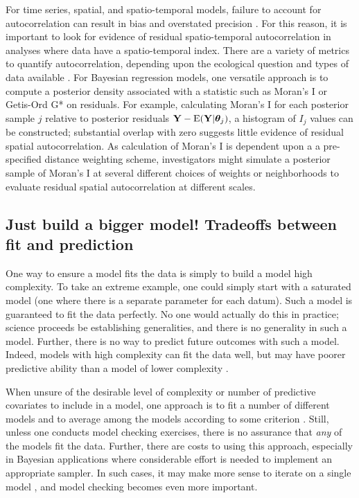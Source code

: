 \documentclass[12pt,english]{article}
\begin{document}
\begin{spacing}{1.9}
For time series, spatial, and spatio-temporal models, failure to account for autocorrelation can result in bias and overstated precision \citep{LichsteinEtAl2002}.  For this reason, it is important to look for evidence of residual spatio-temporal autocorrelation in analyses where data have a spatio-temporal index.  There are a variety of metrics to quantify autocorrelation, depending upon the ecological question and types of data available \cite[e.g.][]{PerryEtAl2002}.  For Bayesian regression models, one versatile approach is to compute a posterior density associated with a statistic such as Moran's I \citep{Moran1950} or Getis-Ord G* \citep{GetisOrd1992} on residuals.  For example, calculating Moran's I for each posterior sample $j$ relative to posterior residuals ${\bf Y} - \textrm{E}({\bf Y} | \boldsymbol{\theta}_j)$, a histogram of $I_j$ values can be constructed; substantial overlap with zero suggests little evidence of residual spatial autocorrelation.  As calculation of Moran's I is dependent upon a a pre-specified distance weighting scheme, investigators might simulate a posterior sample of Moran's I at several different choices of weights or neighborhoods to evaluate residual spatial autocorrelation at different scales.

\subsection{Just build a bigger model!  Tradeoffs between fit and prediction}

One way to ensure a model fits the data is simply to build a model high complexity.  To take an extreme example, one could simply start with a saturated model (one where there is a separate parameter for each datum).  Such a model is guaranteed to fit the data perfectly.  No one would actually do this in practice; science proceeds be establishing generalities, and there is no generality in such a model.  Further, there is no way to predict future outcomes with such a model.  Indeed, models with high complexity can fit the data well, but may have poorer predictive ability than a model of lower complexity \citep{BurnhamAnderson2002}.

When unsure of the desirable level of complexity or number of predictive covariates to include in a model, one approach is to fit a number of different models and to average among the models according to some criterion \citep[see e.g.][]{Green1995,HoetingEtAl1999,LinkBarker2006}. Still, unless one conducts model checking exercises, there is no assurance that \textit{any} of the models fit the data.  Further, there are costs to using this approach, especially in Bayesian applications where considerable effort is needed to implement an appropriate sampler.  In such cases, it may make more sense to iterate on a single model \citep{VerHoefBoveng2015}, and model checking becomes even more important.  


\end{spacing}
\end{document}
